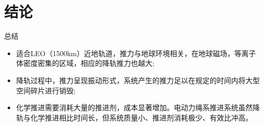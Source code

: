 \documentclass[sectioncirclenumberstyle]{le2iutbmbeamer}
\begin{document}
\section{结论}
\tableofcontentslide[sectionstyle={show/shaded},subsectionstyle={show/show/hide},subsubsectionstyle={hide/hide/hide/hide}]
\begin{frame}{总结}
\begin{itemize}
\item 适合LEO（1500km）近地轨道，推力与地球环境相关，在地球磁场，等离子体密度密集的区域，相应的降轨推力也越大;
\item 降轨过程中，推力呈现振动形式，系统产生的推力足以在规定的时间内将大型空间碎片进行销毁;
\item 化学推进需要消耗大量的推进剂，成本显著增加。电动力绳系推进系统虽然降轨与化学推进相比时间长，但系统质量小、推进剂消耗极少、有效比冲高。
\end{itemize}
\end{frame}
\end{document}
